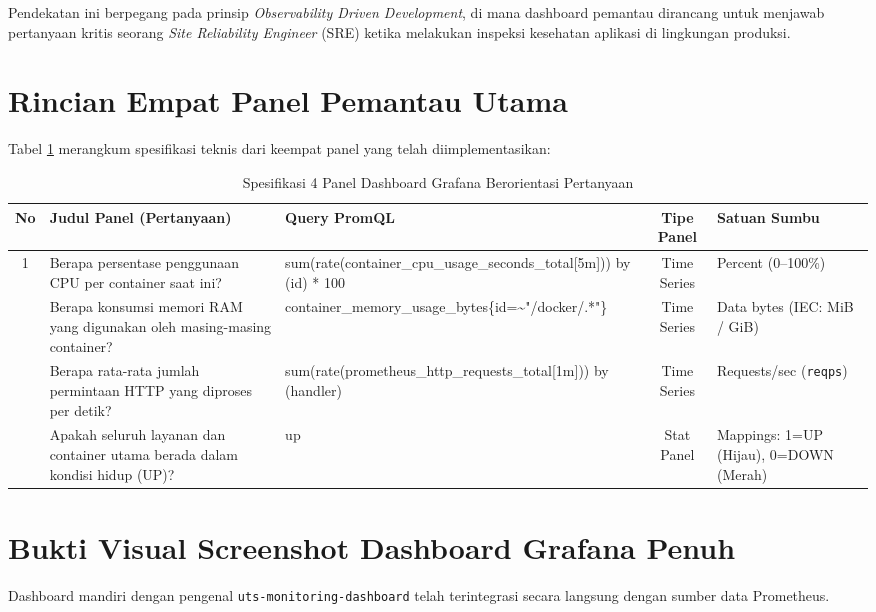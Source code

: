 \documentclass[a4paper,oneside,11pt]{book}
\begin{document}
Pendekatan ini berpegang pada prinsip \textit{Observability Driven Development}, di mana dashboard pemantau dirancang untuk menjawab pertanyaan kritis seorang \textit{Site Reliability Engineer} (SRE) ketika melakukan inspeksi kesehatan aplikasi di lingkungan produksi.

\section{Rincian Empat Panel Pemantau Utama}
Tabel \ref{tab:panels} merangkum spesifikasi teknis dari keempat panel yang telah diimplementasikan:

\begin{table}[H]
\centering
\small
\caption{Spesifikasi 4 Panel Dashboard Grafana Berorientasi Pertanyaan}
\label{tab:panels}
\begin{tabularx}{\textwidth}{c >{\raggedright\arraybackslash}p{4cm} >{\raggedright\arraybackslash\ttfamily\scriptsize}X c >{\raggedright\arraybackslash}p{2.8cm}}
\toprule
\textbf{No} & \textbf{Judul Panel (Pertanyaan)} & \textbf{Query PromQL} & \textbf{Tipe Panel} & \textbf{Satuan Sumbu} \\
\midrule
1 & Berapa persentase penggunaan CPU per container saat ini? & sum(rate(container\_cpu\_usage\_seconds\_total[5m])) by (id) * 100 & Time Series & Percent (0--100\%) \\
\addlinespace
2 & Berapa konsumsi memori RAM yang digunakan oleh masing-masing container? & container\_memory\_usage\_bytes\{id=\textasciitilde"/docker/.*"\} & Time Series & Data bytes (IEC: MiB / GiB) \\
\addlinespace
3 & Berapa rata-rata jumlah permintaan HTTP yang diproses per detik? & sum(rate(prometheus\_http\_requests\_total[1m])) by (handler) & Time Series & Requests/sec (\texttt{reqps}) \\
\addlinespace
4 & Apakah seluruh layanan dan container utama berada dalam kondisi hidup (UP)? & up & Stat Panel & Mappings: 1=UP (Hijau), 0=DOWN (Merah) \\
\bottomrule
\end{tabularx}
\end{table}

\section{Bukti Visual Screenshot Dashboard Grafana Penuh}
Dashboard mandiri dengan pengenal \texttt{uts-monitoring-dashboard} telah terintegrasi secara langsung dengan sumber data Prometheus.
\end{document}
